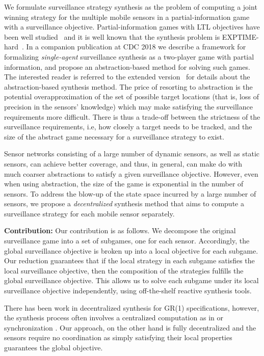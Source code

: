 We formulate surveillance strategy synthesis as the problem of computing a joint winning strategy for the multiple mobile sensors in a partial-information game with a surveillance objective. Partial-information games with LTL objectives have been well studied~\cite{DoyenR11,Chatterjee2013} and it is well known that the synthesis problem is EXPTIME-hard~\cite{Reif84,BerwangerD08}. In a companion publication at CDC 2018 we describe a framework for formalizing \emph{single-agent} surveillance synthesis as a two-player game with partial information, and propose an abstraction-based method for solving such games. The interested reader is referred to the extended version~\cite{arxiv} for details about the abstraction-based synthesis method. The price of resorting to abstraction is the potential overapproximation of the set of possible target locations (that is, loss of precision in the sensors' knowledge) which may make satisfying the surveillance requirements more difficult. There is thus a trade-off between the strictness of the surveillance requirements, i.e, how closely a target needs to be tracked, and the size of the abstract game necessary for a surveillance strategy to exist. 

Sensor networks consisting of a large number of dynamic sensors, as well as static sensors, can achieve better coverage, and thus, in general, can make do with much coarser abstractions to satisfy a given surveillance objective. However, even when using abstraction, the size of the game is exponential in the number of sensors. To address the blow-up of the state space incurred by a large number of sensors, we propose a \emph{decentralized} synthesis method that aims to compute a surveillance strategy for each mobile sensor separately. 

{\bf Contribution:} Our contribution is as follows.
We decompose the original surveillance game into a set of subgames, one for each sensor. Accordingly, the global surveillance objective is  broken up into a local objective for each subgame. Our reduction guarantees that if the local strategy in each subgame satisfies the local surveillance objective, then the composition of the strategies fulfills the global surveillance objective. This allows us to solve each subgame under its local surveillance objective independently, using off-the-shelf reactive synthesis tools. 

 There has been work in decentralized synthesis for GR(1) specifications, however, the synthesis process often involves a centralized computation as in \cite{Kloetzer06} or synchronization \cite{Salar17,Kloetzer11}. Our approach, on the other hand is fully  decentralized and the sensors require no coordination as simply satisfying their local properties guarantees the global objective.

